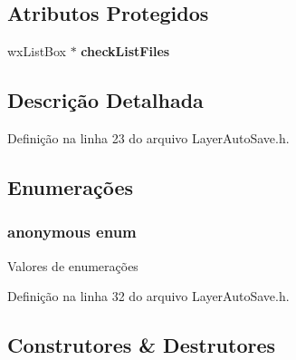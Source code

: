 \subsection*{Atributos Protegidos}
\begin{DoxyCompactItemize}
\item 
wx\+List\+Box $\ast$ {\bf check\+List\+Files}
\end{DoxyCompactItemize}


\subsection{Descrição Detalhada}


Definição na linha 23 do arquivo Layer\+Auto\+Save.\+h.



\subsection{Enumerações}
\subsubsection[{anonymous enum}]{\setlength{\rightskip}{0pt plus 5cm}anonymous enum}\label{class_layer_auto_save_a9fa20789ecad7683da05dd3955441bbf}
\begin{Desc}
\item[Valores de enumerações]\par
\begin{description}
\item[{\em 
B\+T\+N\+\_\+\+O\+P\+EN\label{class_layer_auto_save_a9fa20789ecad7683da05dd3955441bbfa60e35f99cb9979bd4258d64642315452}
}]\item[{\em 
C\+H\+K\+\_\+\+L\+I\+ST\label{class_layer_auto_save_a9fa20789ecad7683da05dd3955441bbfae1a962dcbce9234ae586173a4636af73}
}]\end{description}
\end{Desc}


Definição na linha 32 do arquivo Layer\+Auto\+Save.\+h.



\subsection{Construtores \& Destrutores}
